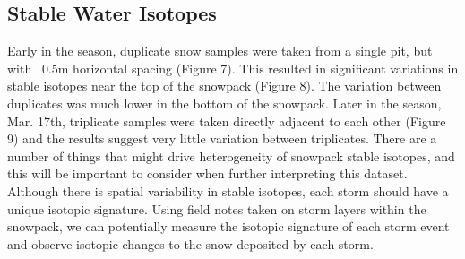 \subsection{Stable Water Isotopes}
Early in the season, duplicate snow samples were taken from a single pit, but with ~0.5m horizontal spacing (Figure 7). This resulted in significant variations in stable isotopes near the top of the snowpack (Figure 8). The variation between duplicates was much lower in the bottom of the snowpack. Later in the season, Mar. 17th, triplicate samples were taken directly adjacent to each other (Figure 9) and the results suggest very little variation between triplicates. There are a number of things that might drive heterogeneity of snowpack stable isotopes, and this will be important to consider when further interpreting this dataset. Although there is spatial variability in stable isotopes, each storm should have a unique isotopic signature. Using field notes taken on storm layers within the snowpack, we can potentially measure the isotopic signature of each storm event and observe isotopic changes to the snow deposited by each storm.